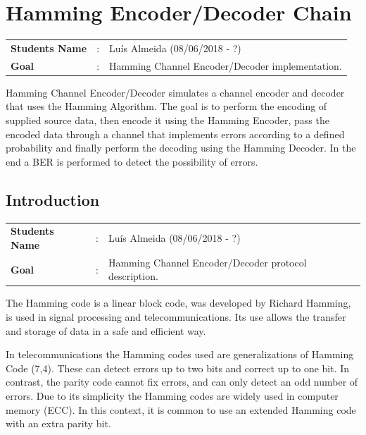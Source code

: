 \clearpage
\section{Hamming Encoder/Decoder Chain}

\begin{refsection}

\begin{tcolorbox}	
	\begin{tabular}{p{2.75cm} p{0.2cm} p{10.5cm}} 	
		\textbf{Students Name} &:& Lu\'{i}s Almeida (08/06/2018 - ?) \\
		\textbf{Goal}          &:& Hamming Channel Encoder/Decoder implementation.
	\end{tabular}
\end{tcolorbox}

Hamming Channel Encoder/Decoder simulates a channel encoder and decoder that uses the Hamming Algorithm. The goal is to perform the encoding of supplied source data, then encode it using the Hamming Encoder, pass the encoded data through a channel that implements errors according to a defined probability and finally perform the decoding using the Hamming Decoder. In the end a BER is performed to detect the possibility of errors.

\subsection{Introduction}
\begin{tcolorbox}	
	\begin{tabular}{p{2.75cm} p{0.2cm} p{10.5cm}} 	
		\textbf{Students Name} &:& Lu\'{i}s Almeida (08/06/2018 - ?)\\
		\textbf{Goal}          &:& Hamming Channel Encoder/Decoder protocol description.
	\end{tabular}
\end{tcolorbox}

The Hamming code is a linear block code, was developed by Richard Hamming, is used in signal processing and telecommunications. Its use allows the transfer and storage of data in a safe and efficient way.

In telecommunications the Hamming codes used are generalizations of Hamming Code (7,4). These can detect errors up to two bits and correct up to one bit. In contrast, the parity code cannot fix errors, and can only detect an odd number of errors. Due to its simplicity the Hamming codes are widely used in computer memory (ECC). In this context, it is common to use an extended Hamming code with an extra parity bit.


\end{refsection}
